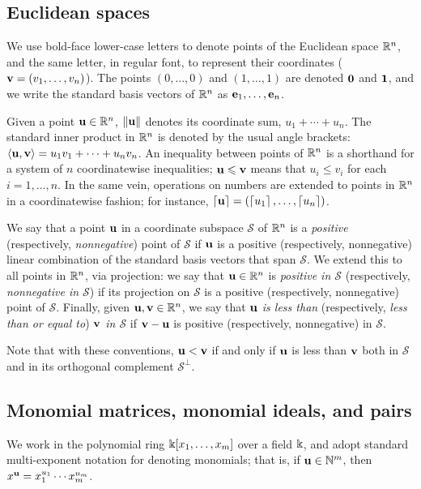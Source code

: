 \documentclass{amsart}
\begin{document}
\subsection{Euclidean spaces}
\label{ss: euclidean spaces and convexity}
We use bold-face lower-case letters to denote points of the Euclidean space $\mathbb{R}^n$, and the same letter, in regular font, to represent their coordinates (\eg $\mathbf{v}=(v_1,\ldots,v_n)$).
The points $(0,\ldots,0)$ and $(1,\ldots,1)$ are denoted $\mathbf{0}$ and $\mathbf{1}$, and we write the standard basis vectors of $\mathbb{R}^n$ as $\mathbf{e}_1,\ldots,\mathbf{e}_n$.

Given a point $\mathbf{u}\in \mathbb{R}^n$, $\| \mathbf{u} \|$ denotes its coordinate sum, $u_1+\cdots+u_n$.
The standard inner product in $\mathbb{R}^n$ is denoted by the usual angle brackets: $\langle \mathbf{u}, \mathbf{v} \rangle = u_1v_1 + \cdots + u_nv_n$.
An inequality between points of $\mathbb{R}^n$ is a shorthand for a system of $n$ coordinatewise inequalities; \eg $\mathbf{u}\leqslant \mathbf{v}$ means that $u_i \le v_i$ for each $i=1,\ldots,n$.
In the same vein, operations on numbers are extended to points in $\mathbb{R}^n$ in a coordinatewise fashion; for instance, $\left\lceil \mathbf{u} \right\rceil=(\left\lceil u_1 \right\rceil,\ldots,\left\lceil u_n \right\rceil)$.

We say that a point $\mathbf{u}$ in a coordinate subspace $\mathcal{S}$ of $\mathbb{R}^n$ is a \emph{positive} (respectively, \emph{nonnegative}) point of $\mathcal{S}$ if $\mathbf{u}$ is a positive (respectively, nonnegative) linear combination of the standard basis vectors that span $\mathcal{S}$.
We extend this to all points in $\mathbb{R}^n$, via projection: we say that $\mathbf{u} \in \mathbb{R}^n$ is \emph{positive in $\mathcal{S}$} (respectively, \emph{nonnegative in $\mathcal{S}$}) if its projection on $\mathcal{S}$ is a positive (respectively, nonnegative) point of $\mathcal{S}$.
Finally, given $\mathbf{u},\mathbf{v}\in \mathbb{R}^n$, we say that \emph{$\mathbf{u}$ is less than} (respectively, \emph{less than or equal to}) \emph{$\mathbf{v}$ in $\mathcal{S}$} if $\mathbf{v}-\mathbf{u}$ is positive (respectively, nonnegative) in $\mathcal{S}$.

Note that with these conventions, $\mathbf{u} < \mathbf{v}$ if and only if $\mathbf{u}$ is less than $\mathbf{v}$ both in $\mathcal{S}$ and in its orthogonal complement $\mathcal{S}^\perp$.

\subsection{Monomial matrices, monomial ideals, and pairs}
\label{monomial newton preliminaries: ss}

We work in the polynomial ring $\Bbbk[x_1, \ldots, x_m]$ over a field $\Bbbk$, and adopt standard multi-exponent notation for denoting monomials; that is, if $\mathbf{u} \in \mathbb{N}^m$, then $x^{\mathbf{u}} = x_1^{u_1} \cdots x_m^{u_m}$.
\end{document}
